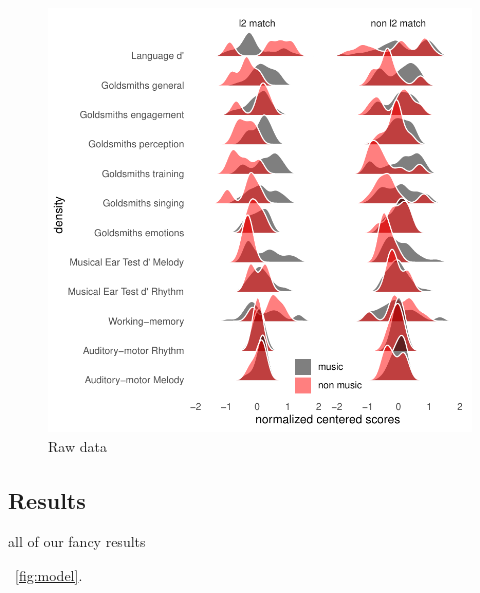 \documentclass[a4paper]{article}
\begin{document}
\begin{figure}[t]
  \centering
  \includegraphics[width=\linewidth]{SP_24_visuals/Normalized_score_distrubutions_by_task.pdf}
  \caption{Raw data}
  \label{fig:raw_data}
\end{figure}

\subsection{Results}

all of our fancy results

~\ref{fig:model}.
\end{document}
